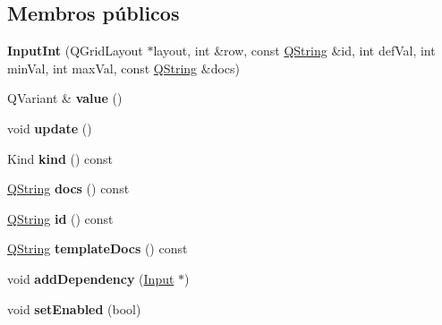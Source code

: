\subsection*{Membros públicos}
\begin{DoxyCompactItemize}
\item 
\hypertarget{class_input_int_afcceb25f05542483d16e1bfac0a65b95}{{\bfseries Input\-Int} (Q\-Grid\-Layout $\ast$layout, int \&row, const \hyperlink{class_q_string}{Q\-String} \&id, int def\-Val, int min\-Val, int max\-Val, const \hyperlink{class_q_string}{Q\-String} \&docs)}\label{class_input_int_afcceb25f05542483d16e1bfac0a65b95}

\item 
\hypertarget{class_input_int_a5dd524f67ae7ed0efa64313fe71e4605}{Q\-Variant \& {\bfseries value} ()}\label{class_input_int_a5dd524f67ae7ed0efa64313fe71e4605}

\item 
\hypertarget{class_input_int_ac5c54df7ed3b930268c8d7752c101725}{void {\bfseries update} ()}\label{class_input_int_ac5c54df7ed3b930268c8d7752c101725}

\item 
\hypertarget{class_input_int_aa9d037bed9f9a083d0cd01485637d843}{Kind {\bfseries kind} () const }\label{class_input_int_aa9d037bed9f9a083d0cd01485637d843}

\item 
\hypertarget{class_input_int_ab817379a6af112723841e17901826ec2}{\hyperlink{class_q_string}{Q\-String} {\bfseries docs} () const }\label{class_input_int_ab817379a6af112723841e17901826ec2}

\item 
\hypertarget{class_input_int_a06be2d738a4fe9fdb941cb24161b26c0}{\hyperlink{class_q_string}{Q\-String} {\bfseries id} () const }\label{class_input_int_a06be2d738a4fe9fdb941cb24161b26c0}

\item 
\hypertarget{class_input_int_a76f4a83c9cf30eb78d2b5f276cf649de}{\hyperlink{class_q_string}{Q\-String} {\bfseries template\-Docs} () const }\label{class_input_int_a76f4a83c9cf30eb78d2b5f276cf649de}

\item 
\hypertarget{class_input_int_a8bbd578a6cbf94a9a9250d0969df2dee}{void {\bfseries add\-Dependency} (\hyperlink{class_input}{Input} $\ast$)}\label{class_input_int_a8bbd578a6cbf94a9a9250d0969df2dee}

\item 
\hypertarget{class_input_int_ac34148588ffb4fc781ecfff97baa742c}{void {\bfseries set\-Enabled} (bool)}\label{class_input_int_ac34148588ffb4fc781ecfff97baa742c}


\end{DoxyCompactItemize}
